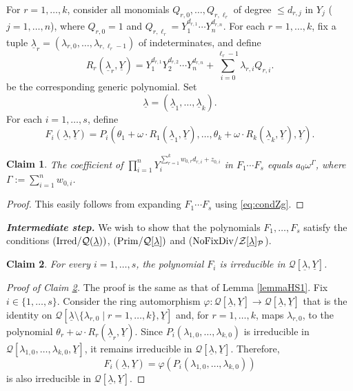 \documentclass[11pt,a4paper,reqno]{amsart}
\newtheorem{claim}{Claim}
\theoremstyle{definition}
\begin{document}
For $r=1,\dots,k$, consider all monomials $Q_{r,0},\dots,Q_{r,\ell_r}$ of degree $\leq d_{r,j}$ in $Y_j$ ($j=1,\dots,n$), where $Q_{r,0}=1$ and $Q_{r,\ell_r}=Y_1^{d_{r,1}}\cdots Y_n^{d_{r,n}}$. For each $r=1,\dots, k$, fix a tuple $\underline{\lambda}_r=(\lambda_{r,0},\dots,\lambda_{r,\ell_r-1})$ of indeterminates, and define
\begin{equation}\label{eq:genericRr}
R_r(\underline{\lambda}_r,\underline{Y})=Y_1^{d_{r,1}}Y_2^{d_{r,2}}\cdots Y_n^{d_{r,n}}+\sum_{i=0} ^{\ell_r-1} \lambda_{r,i} Q_{r,i}.
\end{equation}
be the corresponding generic polynomial. Set
$$
\underline{\lambda}=(\underline{\lambda}_1,\dots,\underline{\lambda}_k).
$$
For each $i=1,\dots,s$, define
$$
F_i(\underline{\lambda},\underline{Y})=P_i\left(\theta_1+ \omega \cdot R_1(\underline{\lambda}_1,\underline{Y}),\dots,\theta_k+ \omega \cdot R_k(\underline{\lambda}_k,\underline{Y}),\underline{Y}\right).
$$
\begin{claim}\label{claim:specterm}
The coefficient of $\prod_{i=1}^nY_i^{\sum_{r=1}^k w_{0,r} d_{r,i}+z_{0,i}}$ in $F_1 \cdots F_s$ equals $a_0 \omega^{\Gamma}$, where $\Gamma:=\sum_{i=1}^n w_{0,i}$.
\end{claim}
\begin{proof}
This easily follows from expanding
$F_1\cdots F_s
$ using \eqref{eq:condZg}.
\end{proof}
\vskip 1mm
\noindent
\emph{\textbf{Intermediate step.}}
We wish to show that the polynomials $F_1,\ldots,F_s$ satisfy the conditions $({\rm Irred}/\mathcal{Q}(\underline{\lambda}))$, $({\rm Prim}/\mathcal{Q}[\underline{\lambda}])$ and (${\rm NoFixDiv}/\mathcal{Z}[\underline{\lambda}]_{\mathcal{P}}$).
\begin{claim}\label{claim:irrfigencas}
For every $i=1,\dots,s$, the polynomial $F_i$ is irreducible in $\mathcal{Q}[\underline{\lambda},\underline{Y}]$.
\end{claim}
\begin{proof}[Proof of Claim \ref{claim:irrfigencas}]
The proof is the same as that of Lemma \ref{lemmaHS1}. {Fix $i\in \{1,\ldots,s\}$.} Consider the ring automorphism $\varphi:\mathcal{Q}[\underline{\lambda},\underline{Y}] \rightarrow \mathcal{Q}[\underline{\lambda},\underline{Y}]$ that is the identity on $\mathcal{Q}[\underline{\lambda} \setminus \{\lambda_{r,0}\mid r=1,\dots,k \},\underline{Y}]$ and, {for $r=1,\ldots,k$, maps $\lambda_{r,0}$,} to 
the polynomial $\theta_r+\omega \cdot R_r(\underline{\lambda}_r,\underline{Y})$. Since $P_i(\lambda_{1,0},\dots,\lambda_{k,0})$ is irreducible in $\mathcal{Q}[\lambda_{1,0},\dots,\lambda_{k,0},\underline{Y}]$, it remains irreducible in $\mathcal{Q}[\underline{\lambda},\underline{Y}]$. Therefore, 
$$F_i(\underline{\lambda},\underline{Y})=\varphi(P_i(\lambda_{1,0},\dots,\lambda_{k,0}))
$$ is also irreducible in $\mathcal{Q}[\underline \lambda, \underline{Y}]$. 
\end{proof}
\end{document}
